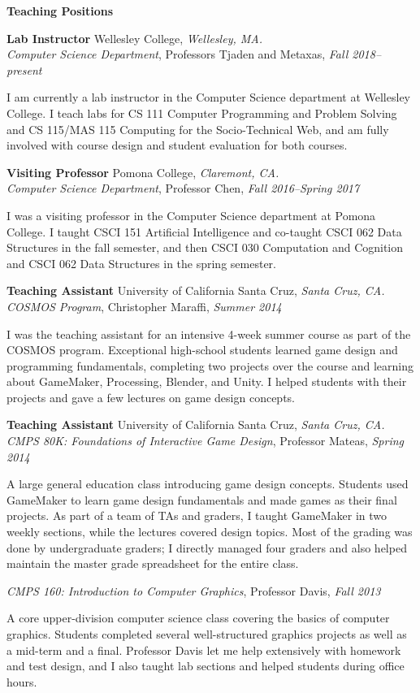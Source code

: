\documentclass[11pt]{article}
\newenvironment{sct}[1]{%
  \vspace{8pt plus 2pt minus 4pt}\textbf{\Large #1} \hrulefill\vspace{6pt}
  \begin{adjustwidth}{6pt}{0pt}
}{%
  \end{adjustwidth}
}
\newcommand{\indented}[1]{\hspace*{\fill}\parbox{\textwidth-22pt}{#1}}
\newcommand{\teachingexperience}[7]{%
  \textbf{#1} #2, \textit{#3.} \\
  \textit{#4}, #5, \textit{#6} \\
  \indented{#7}
  \vspace{7pt plus 2pt minus 2pt}
}
\newcommand{\combexp}[4]{%
  \textbf{#1} #2, \textit{#3.} \\
  #4 \vspace{7pt plus 2pt minus 2pt}
}
\begin{document}
\begin{sct}{Teaching Positions}

\teachingexperience{Lab Instructor}{Wellesley College}{Wellesley, MA}%
{Computer Science Department}{Professors Tjaden and Metaxas}{Fall 2018--present}%
{I am currently a lab instructor in the Computer Science department at
Wellesley College. I teach labs for CS 111 Computer Programming and Problem
Solving and CS 115/MAS 115 Computing for the Socio-Technical Web, and am fully
involved with course design and student evaluation for both courses.}

\teachingexperience{Visiting Professor}{Pomona College}{Claremont, CA}%
{Computer Science Department}{Professor Chen}{Fall 2016--Spring 2017}%
{I was a visiting professor in the Computer Science department at Pomona
College. I taught CSCI 151 Artificial Intelligence and co-taught CSCI 062 Data
Structures in the fall semester, and then CSCI 030 Computation and Cognition
and CSCI 062 Data Structures in the spring semester.}

\teachingexperience{Teaching Assistant}{University of California Santa Cruz}{Santa Cruz, CA}%
{COSMOS Program}{Christopher Maraffi}{Summer 2014}
{I was the teaching assistant for an intensive 4-week summer course as part of
the COSMOS program. Exceptional high-school students learned game design and
programming fundamentals, completing two projects over the course and learning
about GameMaker, Processing, Blender, and Unity. I helped students with their
projects and gave a few lectures on game design concepts.}

\combexp{Teaching Assistant}{University of California Santa Cruz}{Santa Cruz, CA}%
{
\textit{CMPS 80K: Foundations of Interactive Game Design}, Professor Mateas, \textit{Spring 2014} \\
\indented{
A large general education class introducing game design concepts. Students used
GameMaker to learn game design fundamentals and made games as their final
projects. As part of a team of TAs and graders, I taught GameMaker in two
weekly sections, while the lectures covered design topics. Most of the grading
was done by undergraduate graders; I directly managed four graders and also
helped maintain the master grade spreadsheet for the entire class.
}
\vspace{6pt}

\textit{CMPS 160: Introduction to Computer Graphics}, Professor Davis, \textit{Fall 2013} \\
\indented{
A core upper-division computer science class covering the basics of computer
graphics. Students completed several well-structured graphics projects as well
as a mid-term and a final. Professor Davis let me help extensively with
homework and test design, and I also taught lab sections and helped students
during office hours.
}
\vspace{6pt}

}
\end{sct}
\end{document}
